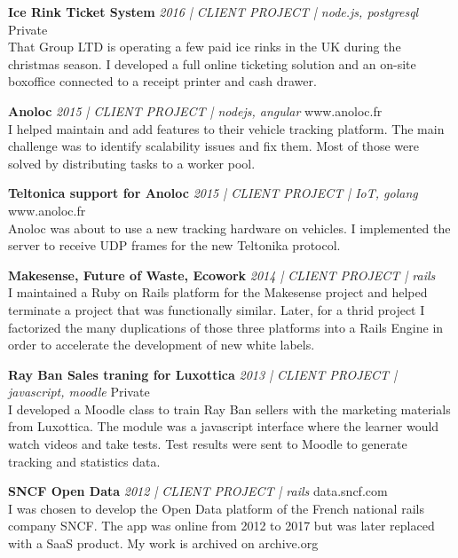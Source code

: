 \documentclass[a4paper]{article}
\begin{document}
{\textbf{Ice Rink Ticket System} \sl 2016 | CLIENT PROJECT | node.js, postgresql} \hfill Private\\
That Group LTD is operating a few paid ice rinks in the UK during the christmas season.
I developed a full online ticketing solution and an on-site boxoffice connected to a receipt printer and cash drawer.
\vspace*{2mm}

{\textbf{Anoloc} \sl 2015 | CLIENT PROJECT | nodejs, angular} \hfill www.anoloc.fr\\
I helped maintain and add features to their vehicle tracking platform.
The main challenge was to identify scalability issues and fix them.
Most of those were solved by distributing tasks to a worker pool.\\
\vspace*{2mm}

{\textbf{Teltonica support for Anoloc} \sl 2015 | CLIENT PROJECT | IoT, golang} \hfill www.anoloc.fr\\
Anoloc was about to use a new tracking hardware on vehicles.
I implemented the server to receive UDP frames for the new Teltonika protocol.
\vspace*{2mm}

{\textbf{Makesense, Future of Waste, Ecowork} \sl 2014 | CLIENT PROJECT | rails} \hfill\\
I maintained a Ruby on Rails platform for the Makesense project and helped terminate a project that was functionally similar.
Later, for a thrid project I factorized the many duplications of those three platforms into a Rails Engine in order
to accelerate the development of new white labels.
\vspace*{2mm}

{\textbf{Ray Ban Sales traning for Luxottica} \sl 2013 | CLIENT PROJECT | javascript, moodle} \hfill Private\\
I developed a Moodle class to train Ray Ban sellers with the marketing materials from Luxottica.
The module was a javascript interface where the learner would watch videos and take tests.
Test results were sent to Moodle to generate tracking and statistics data.\\
\vspace*{2mm}

{\textbf{SNCF Open Data} \sl 2012 | CLIENT PROJECT | rails} \hfill data.sncf.com\\
I was chosen to develop the Open Data platform of the French national rails company SNCF.
The app was online from 2012 to 2017 but was later replaced with a SaaS product.
My work is archived on archive.org\\
\vspace*{2mm}
\end{document}
